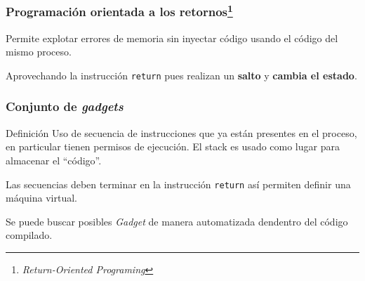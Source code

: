 \documentclass{beamer}
\newcommand { \return } {\texttt{return}\xspace}
\newcommand { \vs } {\vspace{0.5cm}}
\begin{document}
\begin{frame}
    \frametitle{Programación orientada a los retornos\footnote{\textit{Return-Oriented Programing}}}
    Permite explotar errores de memoria sin inyectar código usando el código del mismo proceso.\\

    \vs
    
    Aprovechando la instrucción \return pues realizan un \textbf{salto} y \textbf{cambia el estado}.\\
    
\end{frame}

\begin{frame}
    \frametitle{Conjunto de \textit{gadgets}}
    \begin{block}{Definición}
        Uso de secuencia de instrucciones que {ya están presentes en el proceso}, en particular tienen permisos de ejecución. El stack es usado como lugar para almacenar el ``código''.
    \end{block}

    Las secuencias deben terminar en la instrucción \return así permiten definir una máquina virtual.\vs
    
    \vs
    
    Se puede buscar posibles \textit{Gadget} de manera automatizada dendentro del código compilado.

\end{frame}
\end{document}
